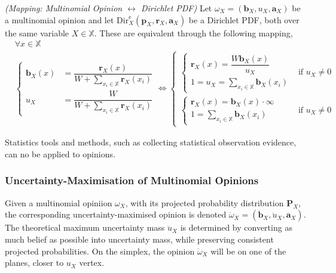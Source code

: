 \begin{definition}
    \emph{(Mapping: Multinomial Opinion $\leftrightarrow$ Dirichlet PDF)} Let $\omega_X = (\mathbf{b}_X, u_X, \mathbf{a}_X)$ be a multinomial opinion and let $\mathrm{Dir}^\mathrm{e}_X(\mathbf{p}_X, \mathbf{r}_X, \mathbf{a}_X)$ be a Dirichlet PDF, both over the same variable $X \in \mathbb{X}$. These are equivalent through the following mapping,
    \begin{equation}
        \begin{split}
            & \forall x \in \mathbb{X} \\
            & \begin{cases}
                \mathbf{b}_X(x) & = \dfrac{\mathbf{r}_X(x)}{W + \sum\limits_{x_i \in \mathbb{X}} \mathbf{r}_X(x_i)} \\
                u_X & = \dfrac{W}{W + \sum\limits_{x_i \in \mathbb{X}} \mathbf{r}_X(x_i)}
            \end{cases} \Leftrightarrow
            \begin{cases}
                \begin{cases}
                    \mathbf{r}_X(x) = \dfrac{W \mathbf{b}_X(x)}{u_X} \\
                    1 = u_X = \sum\limits_{x_i \in \mathbb{X}} \mathbf{b}_X(x_i)
                \end{cases} & \text{if } u_X \neq 0 \\
                \begin{cases}
                    \mathbf{r}_X(x) = \mathbf{b}_X(x) \cdot \infty \\
                    1 = \sum\limits_{x_i \in \mathbb{X}} \mathbf{b}_X(x_i)
                \end{cases} & \text{if } u_X \neq 0
            \end{cases}
        \end{split}
    \end{equation}
\end{definition}

Statistics tools and methods, such as collecting statistical observation evidence, can no be applied to opinions.

\subsubsection{Uncertainty-Maximisation of Multinomial Opinions}

Given a multinomial opiniion $\omega_X$, with its projected probability distribution $\mathbf{P}_X$, the corresponding uncertainty-maximised opinion is denoted $\ddot{\omega}_X = (\ddot{\mathbf{b}}_X, \ddot{u}_X, \mathbf{a}_X)$. The theoretical maximum uncertainty mass $\ddot{u}_X$ is determined by converting as much belief as possible into uncertainty mass, while preserving consistent projected probabilities. On the simplex, the opinion $\ddot{\omega}_X$ will be on one of the planes, closer to $u_X$ vertex.

